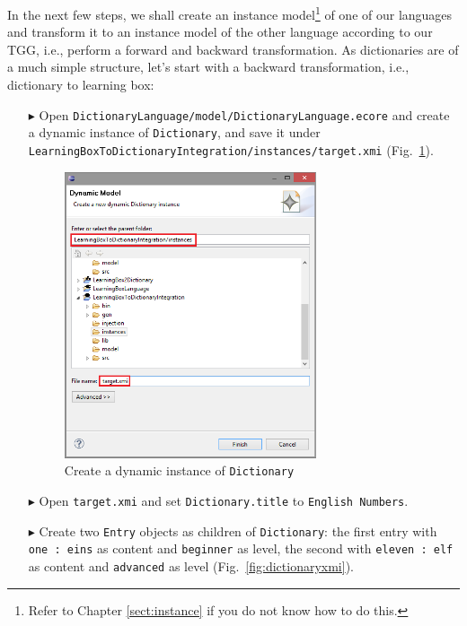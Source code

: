 In the next few steps, we shall create an instance model\footnote{Refer to Chapter \ref{sect:instance} if you do not know how to do this.} of one of our languages and  transform it to an instance model of the other language according to our TGG, i.e., perform a forward and backward transformation.
As dictionaries are of a much simple structure, let's start with a backward transformation, i.e., dictionary to learning box:

\begin{enumerate}
\item[$\blacktriangleright$] Open \texttt{Dictionary\-Language/model/Dictionary\-Language.ecore} and create a dynamic instance of \texttt{Dictionary}, and save it under \texttt{Learn\-ing\-Box\-To\-Dictionary\-In\-te\-gra\-tion/in\-stan\-ces/target.xmi} (Fig.~\ref{fig:create_instance_dict}).

\begin{figure}[htbp]
\begin{center}
  \includegraphics[width=0.7\textwidth]{pics/tggBilder/transformation/tgg24}
  \caption{Create a dynamic instance of \texttt{Dictionary}}
  \label{fig:create_instance_dict}
\end{center}
\end{figure}

\item[$\blacktriangleright$] Open \texttt{target.xmi} and set \texttt{Dictionary.title} to \texttt{English Numbers}.
\item[$\blacktriangleright$] Create two \texttt{Entry} objects as children of \texttt{Dictionary}: the first entry with \texttt{one : eins} as content and \texttt{beginner} as level, the second with \texttt{eleven : elf} as content and \texttt{advanced} as level (Fig.~\ref{fig:dictionaryxmi}).


\end{enumerate}
